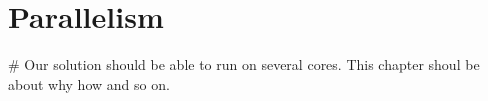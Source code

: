 \chapter{Parallelism}
\# Our solution should be able to run on several cores. 
This chapter shoul be about why how and so on.
